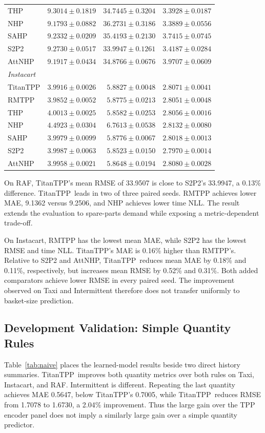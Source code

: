 \documentclass[runningheads]{llncs}
\newcommand{\method}{TitanTPP}
\begin{document}
\begin{table}[p]
\begin{tabular}{lrrr}
THP & $9.3014\pm0.1819$ & $34.7445\pm0.3204$ & $3.3928\pm0.0187$\\
NHP & $9.1793\pm0.0882$ & $36.2731\pm0.3186$ & $\mathbf{3.3889\pm0.0556}$\\
SAHP & $9.2332\pm0.0209$ & $35.4193\pm0.2130$ & $3.7415\pm0.0745$\\
S2P2 & $9.2730\pm0.0517$ & $33.9947\pm0.1261$ & $3.4187\pm0.0284$\\
AttNHP & $9.1917\pm0.0434$ & $34.8766\pm0.0676$ & $3.9707\pm0.0609$\\
\midrule
\multicolumn{4}{l}{\textit{Instacart}}\\
TitanTPP & $3.9916\pm0.0026$ & $5.8827\pm0.0048$ & $2.8071\pm0.0041$\\
RMTPP & $\mathbf{3.9852\pm0.0052}$ & $5.8775\pm0.0213$ & $2.8051\pm0.0048$\\
THP & $4.0013\pm0.0025$ & $5.8582\pm0.0253$ & $2.8056\pm0.0016$\\
NHP & $4.4923\pm0.0304$ & $6.7613\pm0.0538$ & $2.8132\pm0.0080$\\
SAHP & $3.9979\pm0.0099$ & $5.8776\pm0.0067$ & $2.8018\pm0.0013$\\
S2P2 & $3.9987\pm0.0063$ & $\mathbf{5.8523\pm0.0150}$ & $\mathbf{2.7970\pm0.0014}$\\
AttNHP & $3.9958\pm0.0021$ & $5.8648\pm0.0194$ & $2.8080\pm0.0028$\\
\bottomrule
\end{tabular}
\end{table}

On RAF, \method's mean RMSE of 33.9507 is close to S2P2's 33.9947, a 0.13\%
difference. \method\ leads in two of three paired seeds. RMTPP achieves lower
MAE, 9.1362 versus 9.2506, and NHP achieves lower time NLL. The result
extends the evaluation to spare-parts demand while exposing a metric-dependent
trade-off.

On Instacart, RMTPP has the lowest mean MAE, while S2P2 has the lowest RMSE
and time NLL. \method's MAE is 0.16\% higher than RMTPP's. Relative to S2P2
and AttNHP, \method\ reduces mean MAE by 0.18\% and 0.11\%, respectively,
but increases mean RMSE by 0.52\% and 0.31\%. Both added comparators achieve
lower RMSE in every paired seed. The improvement observed on Taxi and
Intermittent therefore does not transfer uniformly to basket-size prediction.

\subsection{Development Validation: Simple Quantity Rules}
Table~\ref{tab:naive} places the learned-model results beside two direct
history summaries. \method\ improves both quantity metrics over both rules
on Taxi, Instacart, and RAF. Intermittent is different. Repeating the last
quantity achieves MAE 0.5647, below \method's 0.7005, while \method\ reduces
RMSE from 1.7078 to 1.6730, a 2.04\% improvement. Thus the large gain over
the TPP encoder panel does not imply a similarly large gain over a simple
quantity predictor.
\end{document}
